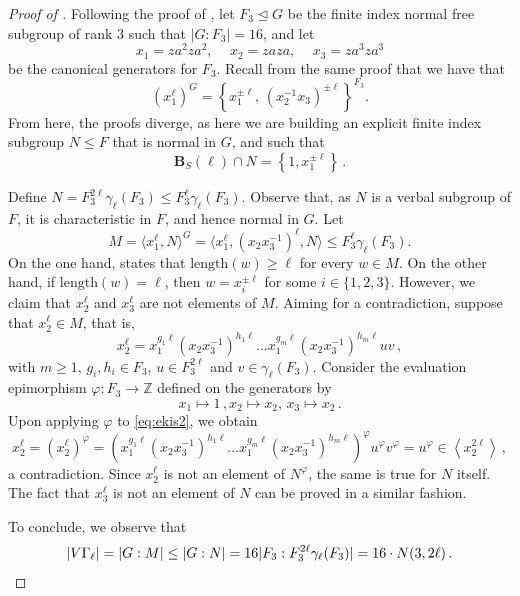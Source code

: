 \documentclass[a4paper]{amsart}
\newcommand{\len}{\mathrm{length}}
\newcommand{\B}{\mathbf{B}}
\newcommand{\0}{\mathbf{0}}
\theoremstyle{definition}
\begin{document}
\begin{proof}[Proof of ]
Following the proof of , let $F_3 \unlhd G$ be the finite index normal free subgroup of rank $3$ such that $|G: F_3| = 16$, and let 
\[  x_1 = za^2za^2, \, \quad x_2 = zaza, \, \quad x_3 = za^3za^3 \]
be the canonical generators for $F_3$.
Recall from the same proof that 
we have that
\[ \left( x_1^{\ell} \right)^G = \left\{ x_1^{\pm \ell},\,(x_2^{-1}x_3)^{\pm \ell} \right\} ^{F_3}. \]
From here, the proofs diverge, as here we are building an explicit finite index subgroup $N \leq F$ that is normal in $G$, and such that
\[\B_S(\ell) \cap N = \left\{ 1, x_{1}^{\pm \ell} \right\} \,.\]

Define $N=F_3^{2 \ell} \gamma_{\ell}(F_3) \leq F_3^\ell \gamma_\ell(F_3)$. Observe that, as $N$ is a verbal subgroup of $F$, it is characteristic in $F$, and hence normal in $G$. Let
\[ M = \langle x_1^\ell, N\rangle^G = \langle x_1^\ell, (x_2 x_3^{-1})^\ell, N \rangle  \leq F_3^{\ell}\gamma_{\ell}(F_3).\]
On the one hand,  states that $\len(w) \geq \ell$ for every $w \in M$. On the other hand, if $\len(w) = \ell$, then $w=x_i^{\pm \ell}$ for some $i \in \{1,2,3\}$. However, we claim that $x_2^\ell$ and $x_3^\ell$ are not elements of $M$. Aiming for a contradiction, suppose that $x_2^\ell \in M$, that is,
\begin{equation} \label{eq:ekis2}
    x_2^\ell = x_1^{g_1 \ell} (x_2 x_{3}^{-1})^{h_1 \ell} \dots x_1^{g_m \ell} (x_2 x_3^{-1})^{h_m \ell} u v \,,
\end{equation}
with $m \geq 1$, $g_i, h_i \in F_3$, $u \in F_3^{2 \ell}$ and $v \in \gamma_\ell(F_3)$.
Consider the evaluation epimorphism $\varphi: F_3 \rightarrow \mathbb{Z}$ defined on the generators by
\[ x_1 \mapsto 1 \,, x_2 \mapsto x_2, \, x_3 \mapsto x_2 \,.\]
Upon applying $\varphi$ to \cref{eq:ekis2}, we obtain
\[ x_2^\ell = (x_2^\ell)^\varphi = \left(x_1^{g_1 \ell} (x_2 x_{3}^{-1})^{h_1 \ell} \dots x_1^{g_m \ell} (x_2 x_3^{-1})^{h_m \ell} \right)^ \varphi u^\varphi v^\varphi = u^\varphi \in \left\langle x_2^{2\ell} \right \rangle \,,\]
a contradiction. Since $x_2^\ell$ is not an element of $N^\varphi$, the same is true for $N$ itself. The fact that $x_3^\ell$ is not an element of $N$ can be proved in a similar fashion. 

To conclude, we observe that
\[|V\Gamma_\ell| = |G : M| \leq |G: N| = 16 |F_3 : F_3^{2\ell} \gamma_\ell(F_3)| = 16 \cdot N(3,2\ell) \,. \qedhere\]
\end{proof}



\end{document}
